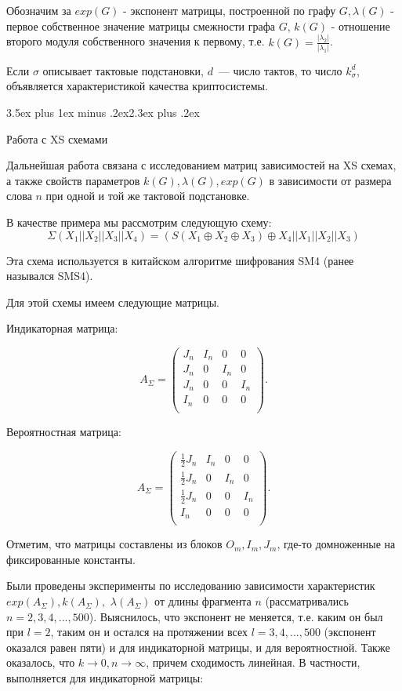\documentclass[a4paper,12pt]{report}
\makeatletter
\theoremstyle{plain} %
\theoremstyle{definition}
\theoremstyle{remark}
\renewcommand{\section}{\@startsection{section}{1}{18pt}%
{3.5ex plus 1ex minus .2ex}{2.3ex plus .2ex}%
{\normalfont\Large\bfseries\raggedright}}%
\makeatother
\begin{document}
\begin{large}
Обозначим за $exp(G)$ - экспонент матрицы, построенной по графу $G, \lambda(G)$ - первое  собственное значение матрицы смежности графа $G$, $k(G)$ - отношение второго модуля собственного значения к первому, т.е. $k(G) = \frac{|\lambda_2|}{|\lambda_1|}$.

Если $\sigma$ описывает тактовые подстановки, $d$~--- число тактов,
то число $k_\sigma^d$, объявляется характеристикой качества криптосистемы.

\section{Работа с XS схемами}

Дальнейшая работа связана с исследованием матриц зависимостей на XS схемах, а также свойств параметров $k(G), \lambda(G), exp(G)$ в зависимости от размера слова $n$ при одной и той же тактовой подстановке.

В качестве примера мы рассмотрим следующую схему: 
$$\Sigma(X_1||X_2||X_3||X_4)=(S(X_1\oplus X_2 \oplus X_3)\oplus X_4 || X_1 || X_2 || X_3)$$

Эта схема используется в китайском алгоритме шифрования SM4 (ранее назывался SMS4).

Для этой схемы имеем следующие матрицы.

Индикаторная матрица:

$$
A_{\Sigma} = 
\begin{pmatrix} 
J_n & I_n & 0 & 0\\ 
J_n & 0 & I_n & 0\\
 J_n & 0 & 0 & I_n\\
I_n &  0  & 0 & 0\\
\end{pmatrix}.
$$

Вероятностная матрица:

$$
A_{\Sigma} = 
\begin{pmatrix} 
\frac{1}{2}
J_n & I_n & 0 & 0\\ 
\frac{1}{2}J_n & 0 & I_n & 0\\
\frac{1}{2} J_n & 0 & 0 & I_n\\
I_n &  0  & 0 & 0\\
\end{pmatrix}.
$$

Отметим, что матрицы составлены из блоков $O_m, I_m, J_m$, где-то домноженные на фиксированные константы.

Были проведены эксперименты по исследованию зависимости характеристик $exp(A_{\Sigma}), k(A_{\Sigma}),$ $\lambda(A_{\Sigma})$ от длины фрагмента $n$ (рассматривались $n=2,3,4,...,500$). Выяснилось, что экспонент не меняется, т.е. каким он был при $l=2$, таким он и остался на протяжении всех $l=3,4,...,500$ (экспонент оказался равен пяти) и для индикаторной матрицы, и для вероятностной. Также оказалось, что $k \rightarrow 0, n \rightarrow \infty$, причем сходимость линейная. В частности, выполняется для индикаторной матрицы:


\end{large}
\end{document}
